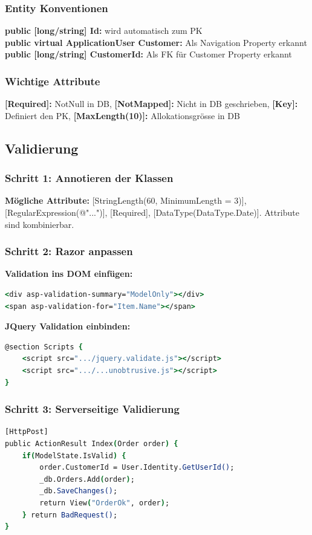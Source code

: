 \subsubsection{Entity Konventionen}
\textbf{public [long/string] Id:} wird automatisch zum PK\\
\textbf{public virtual ApplicationUser Customer:} Als Navigation Property erkannt\\
\textbf{public [long/string] CustomerId:} Als FK für Customer Property erkannt\\
\subsubsection{Wichtige Attribute}
\textbf{[Required]:} NotNull in DB,
\textbf{[NotMapped]:} Nicht in DB geschrieben,
\textbf{[Key]:} Definiert den PK,
\textbf{[MaxLength(10)]:} Allokationsgrösse in DB

\subsection{Validierung}
\subsubsection{Schritt 1: Annotieren der Klassen}
\textbf{Mögliche Attribute:} [StringLength(60, MinimumLength = 3)], [RegularExpression(@"...")], [Required], [DataType(DataType.Date)].
Attribute sind kombinierbar.
\subsubsection{Schritt 2: Razor anpassen}
\textbf{Validation ins DOM einfügen:}
\begin{lstlisting}[language=csh]
<div asp-validation-summary="ModelOnly"></div>
<span asp-validation-for="Item.Name"></span>
\end{lstlisting}
\textbf{JQuery Validation einbinden:}
\begin{lstlisting}[language=csh]
@section Scripts {
    <script src=".../jquery.validate.js"></script>
    <script src=".../...unobtrusive.js"></script>
}
\end{lstlisting}

\subsubsection{Schritt 3: Serverseitige Validierung}
\begin{lstlisting}[language=csh]
[HttpPost]
public ActionResult Index(Order order) {
    if(ModelState.IsValid) {
        order.CustomerId = User.Identity.GetUserId();
        _db.Orders.Add(order);
        _db.SaveChanges();
        return View("OrderOk", order);
    } return BadRequest();
}
\end{lstlisting}

